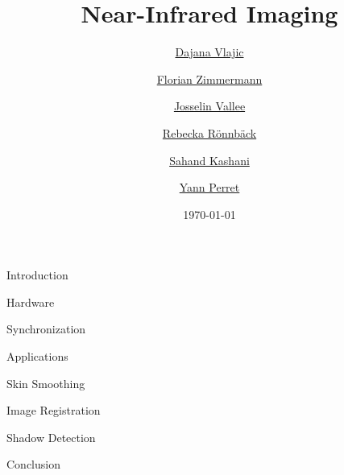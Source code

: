 \documentclass[11pt, a4paper]{article}
\title{Near-Infrared Imaging}
\author{
    \href{mailto:dajana.vlajic@epfl.ch}{Dajana Vlajic} \and
    \href{mailto:florian.zimmermann@epfl.ch}{Florian Zimmermann} \and
    \href{mailto:josselin.vallee@epfl.ch}{Josselin Vallee} \and
    \href{mailto:rebecka.ronnback@epfl.ch}{Rebecka Rönnbäck} \and
    \href{mailto:sahand.kashani-akhavan@epfl.ch}{Sahand Kashani} \and
    \href{mailto:yann.perret@epfl.ch}{Yann Perret}
}
\date{\today}
\begin{document}
\maketitle

\begin{section}{Introduction}
    \label{sec:introduction}

\end{section}

\begin{section}{Hardware}
    \label{sec:hardware}

\end{section}

\begin{section}{Synchronization}
    \label{sec:synchronization}

\end{section}

\begin{section}{Applications}

    \begin{subsection}{Skin Smoothing}
        \label{sec:skin_smoothing}

        \begin{subsubsection}{Image Registration}
            \label{sec:image_registration}
        \end{subsubsection}

    \end{subsection}

    \begin{subsection}{Shadow Detection}
        \label{sec:shadow_detection}

    \end{subsection}

\end{section}

\begin{section}{Conclusion}
    \label{sec:conclusion}

\end{section}

\printbibliography
\end{document}
